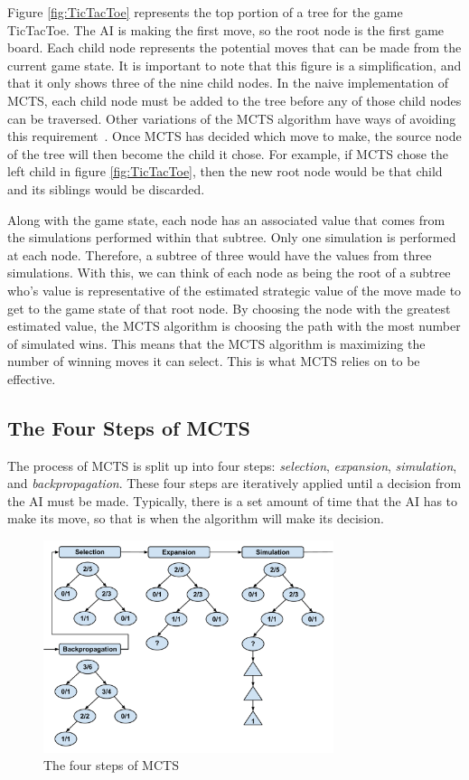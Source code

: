 \documentclass{sig-alternate}
\begin{document}
Figure \ref{fig:TicTacToe} represents the top portion of a tree for the game TicTacToe. The AI is making the first move, so the root node is the first game board. Each child node represents the potential moves that can be made from the current game state. It is important to note that this figure is a simplification, and that it only shows three of the nine child nodes. In the naive implementation of MCTS, each child node must be added to the tree before any of those child nodes can be traversed. Other variations of the MCTS algorithm have ways of avoiding this requirement~\cite{ActionSelection}. Once MCTS has decided which move to make, the source node of the tree will then become the child it chose. For example, if MCTS chose the left child in figure \ref{fig:TicTacToe}, then the new root node would be that child and its siblings would be discarded.

Along with the game state, each node has an associated value that comes from the simulations performed within that subtree. Only one simulation is performed at each node. Therefore, a subtree of three would have the values from three simulations. With this, we can think of each node as being the root of a subtree who's value is representative of the estimated strategic value of the move made to get to the game state of that root node. By choosing the node with the greatest estimated value, the MCTS algorithm is choosing the path with the most number of simulated wins. This means that the MCTS algorithm is maximizing the number of winning moves it can select. This is what MCTS relies on to be effective.

\subsection{The Four Steps of MCTS}
The process of MCTS is split up into four steps: \textit{selection}, \textit{expansion}, \textit{simulation}, and \textit{backpropagation}. These four steps are iteratively applied until a decision from the AI must be made. Typically, there is a set amount of time that the AI has to make its move, so that is when the algorithm will make its decision.

\begin{figure}[h]
	\includegraphics[width=8.5cm]{MCTSFourStepProcess.pdf}
	\centering
	\caption{The four steps of MCTS}
	\label{fig:FourSteps}
\end{figure}
\end{document}
